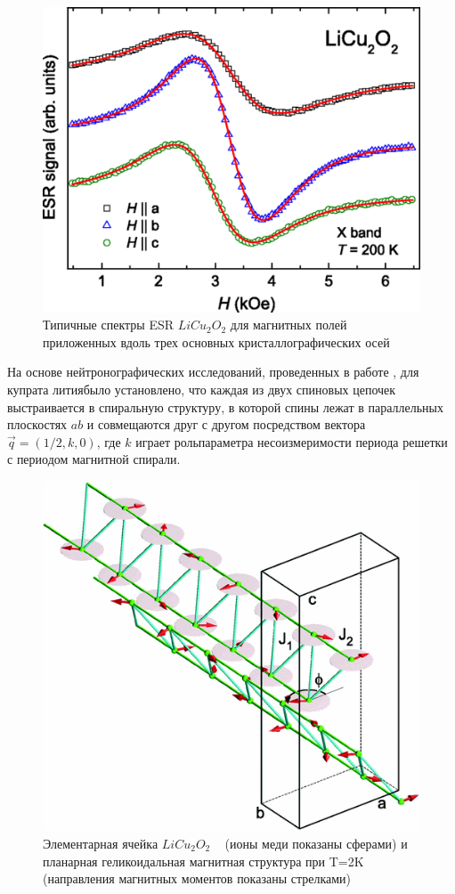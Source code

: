 \documentclass[11pt]{article}
\begin{document}
\begin{figure}[htp]
\centering
\includegraphics[scale=0.7]{LiCu2O2_4}
\caption {Типичные спектры ESR $LiCu_2O_2$ для магнитных полей приложенных вдоль трех основных кристаллографических осей ~\cite{seidov2017}}
\label{}
\end{figure}

На основе нейтронографических исследований, проведенных в работе   , для купрата литиябыло установлено, что каждая из двух спиновых цепочек выстраивается в спиральную структуру, в которой спины лежат в параллельных плоскостях $ab$ и совмещаются друг с другом посредством вектора $\vec q = (1/2,k,0)$, где $k$ играет рольпараметра несоизмеримости периода решетки с периодом магнитной спирали. 

\begin{figure}[htp]
\centering
\includegraphics[scale=0.7]{LiCu2O2_5}
\caption {Элементарная ячейка $LiCu_2O_2$ ~\cite{masuda2004} (ионы меди показаны сферами) и планарная геликоидальная магнитная структура при T=2K (направления магнитных моментов показаны стрелками)}
\label{}
\end{figure}
\end{document}
